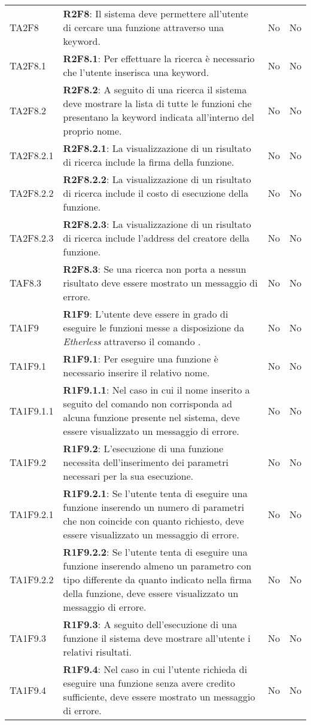 \begin{longtable}{ 
		>{\centering}p{} 
		>{}p{} 
		>{\centering}p{}
		>{\centering}p{} }
	TA2F8 		& \textbf{R2F8}: Il sistema deve permettere all'utente di cercare una funzione attraverso una keyword. 																					& No & No \tabularnewline
	TA2F8.1 		& \textbf{R2F8.1}: Per effettuare la ricerca è necessario che l'utente inserisca una keyword. 																							& No & No \tabularnewline
	TA2F8.2 		& \textbf{R2F8.2}: A seguito di una ricerca il sistema deve mostrare la lista di	tutte le funzioni che presentano la keyword indicata all'interno del proprio nome.						& No & No \tabularnewline
	TA2F8.2.1 	& \textbf{R2F8.2.1}: La visualizzazione di un risultato di ricerca include	la firma della funzione.																						& No & No \tabularnewline
	TA2F8.2.2 	& \textbf{R2F8.2.2}: La visualizzazione di un risultato di ricerca include	il costo di esecuzione della funzione.																			& No & No \tabularnewline
	TA2F8.2.3 	& \textbf{R2F8.2.3}: La visualizzazione di un risultato di ricerca include l'address del creatore della funzione.																			& No & No \tabularnewline
	TAF8.3 		& \textbf{R2F8.3}: Se una ricerca non porta a nessun risultato deve essere mostrato un messaggio di errore. 																				& No & No \tabularnewline
	
	TA1F9 		& \textbf{R1F9}: L'utente deve essere in grado di eseguire le funzioni messe a disposizione da \textit{Etherless} attraverso il comando \run{}.											& No & No \tabularnewline
	TA1F9.1 		& \textbf{R1F9.1}: Per eseguire una funzione è necessario inserire il relativo nome. 																										& No & No \tabularnewline
	TA1F9.1.1 	& \textbf{R1F9.1.1}: Nel caso in cui il nome inserito a seguito del comando \run{} non corrisponda ad alcuna funzione presente nel sistema, deve essere visualizzato un messaggio di errore. & No & No \tabularnewline
	TA1F9.2 		& \textbf{R1F9.2}: L'esecuzione di una funzione necessita dell'inserimento dei parametri necessari per la sua esecuzione.																	& No & No \tabularnewline
	TA1F9.2.1	& \textbf{R1F9.2.1}: Se l'utente tenta di eseguire una funzione inserendo un numero di parametri che non coincide con quanto richiesto, deve essere visualizzato un messaggio di errore. 	& No & No \tabularnewline
	TA1F9.2.2 	& \textbf{R1F9.2.2}: Se l'utente tenta di eseguire una funzione inserendo almeno un parametro con tipo differente da quanto indicato nella firma della funzione, deve essere visualizzato un messaggio di errore. & No & No \tabularnewline
	TA1F9.3 		& \textbf{R1F9.3}: A seguito dell'esecuzione di una funzione il sistema deve mostrare all'utente i relativi risultati. 																	& No & No \tabularnewline
	TA1F9.4 		& \textbf{R1F9.4}: Nel caso in cui l'utente richieda di eseguire una funzione senza avere credito sufficiente, deve essere mostrato un messaggio di errore.								& No & No \tabularnewline
	

\end{longtable}
